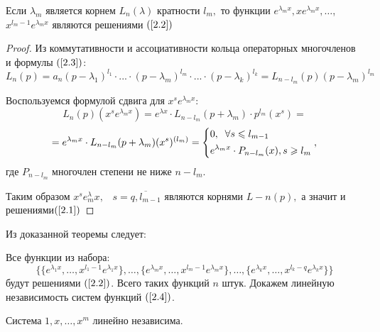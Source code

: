 \begin{theorem}
Если $\lambda_m$ является корнем $L_n(\lambda)$ кратности $l_m,$ то функции $e^{\lambda_m x}, xe^{\lambda_m x}, \dots$, $x^{l_m-1}e^{\lambda_m x}$ являются решениями $(\ref{2.2})$
\end{theorem}
\begin{proof}
Из коммутативности и ассоциативности кольца операторных многочленов и формулы $(\ref{2.3})$: $L_n(p)=a_n(p-\lambda_1)^{l_1}\cdot ... \cdot (p-\lambda_m)^{l_m}\cdot ... \cdot (p-\lambda_k)^{l_k}=L_{n-l_m}(p)(p-\lambda_m)^{l_m}$\par
Воспользуемся формулой сдвига для $x^se^{\lambda_m x}:$
$$L_n(p)(x^se^{\lambda_m x})=e^{\lambda x}\cdot L_{n-l_m}(p+\lambda_m) \cdot p^{l_m}(x^s)=$$
$$=e^{\lambda_m x}\cdot L_{n-l_m}(p+\lambda_m)(x^s)^{(l_m)}=\left\{\begin{gathered}
    0, \;\;\forall s\leqslant l_{m-1}\hfill
    \\
    e^{\lambda_m x}\cdot P_{n-l_m}(x), s\geqslant l_m \hfill
    \\
\end{gathered}
\right.,$$
где $P_{n-l_m}$ многочлен степени не ниже $n-l_m$.\par
Таким образом $x^se^\lambda_m x, \;\;\;s=\overline{q, l_{m-1}}$ являются корнями $L-n(p),$ а значит и решениями$(\ref{2.1})$
\end{proof}
Из доказанной теоремы следует:
\par
Все функции из набора:
\begin{equation}
\tag{2.4}
\label{2.4}
    \Bigg\{\{e^{\lambda_1 x}, \dots, x^{l_1-1}e^{\lambda_1 x}\}, \dots, \{e^{\lambda_mx}, \dots, x^{l_m-1 }e^{\lambda_mx}\}, \dots, \{e^{\lambda_k x}, \dots, x^{l_k-q}e^{\lambda_k x}\}\Bigg\}
\end{equation}
будут решениями $(\ref{2.2})$. Всего таких функций $n$ штук. Докажем линейную независимость систем функций $(\ref{2.4})$.
\begin{lemma}\label{lem1}
Система $1, x, \dots, x^m$ линейно независима. 
\end{lemma}

